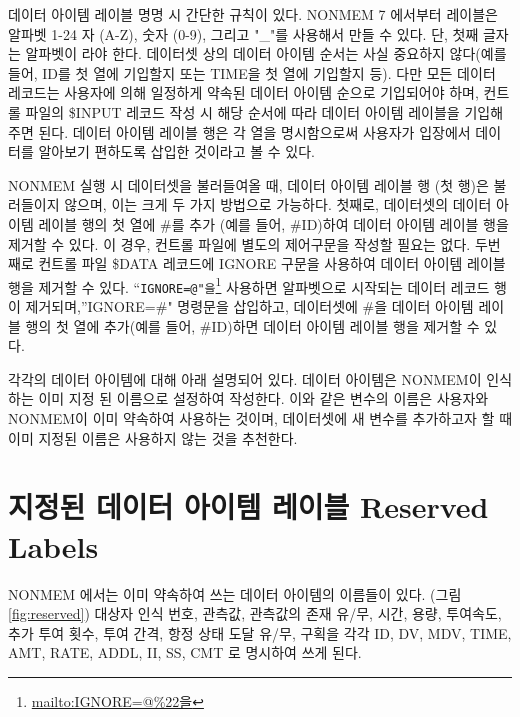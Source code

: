 \documentclass[
  10pt,
]{krantz}
\renewcommand{\href}[2]{#2\footnote{\url{#1}}}
\begin{document}
데이터 아이템 레이블 명명 시 간단한 규칙이 있다. NONMEM 7 에서부터 레이블은 알파벳 1-24 자 (A-Z), 숫자 (0-9), 그리고 "\_"를 사용해서 만들 수 있다. 단, 첫째 글자는 알파벳이 라야 한다. 데이터셋 상의 데이터 아이템 순서는 사실 중요하지 않다(예를 들어, ID를 첫 열에 기입할지 또는 TIME을 첫 열에 기입할지 등). 다만 모든 데이터 레코드는 사용자에 의해 일정하게 약속된 데이터 아이템 순으로 기입되어야 하며, 컨트롤 파일의 \$INPUT 레코드 작성 시 해당 순서에 따라 데이터 아이템 레이블을 기입해주면 된다. 데이터 아이템 레이블 행은 각 열을 명시함으로써 사용자가 입장에서 데이터를 알아보기 편하도록 삽입한 것이라고 볼 수 있다.

NONMEM 실행 시 데이터셋을 불러들여올 때, 데이터 아이템 레이블 행 (첫 행)은 불러들이지 않으며, 이는 크게 두 가지 방법으로 가능하다. 첫째로, 데이터셋의 데이터 아이템 레이블 행의 첫 열에 \#를 추가 (예를 들어, \#ID)하여 데이터 아이템 레이블 행을 제거할 수 있다. 이 경우, 컨트롤 파일에 별도의 제어구문을 작성할 필요는 없다. 두번째로 컨트롤 파일 \$DATA 레코드에 IGNORE 구문을 사용하여 데이터 아이템 레이블 행을 제거할 수 있다. ``\href{mailto:IGNORE=@\%22을}{\nolinkurl{IGNORE=@"을}} 사용하면 알파벳으로 시작되는 데이터 레코드 행이 제거되며,''IGNORE=\#" 명령문을 삽입하고, 데이터셋에 \#을 데이터 아이템 레이블 행의 첫 열에 추가(예를 들어, \#ID)하면 데이터 아이템 레이블 행을 제거할 수 있다.

각각의 데이터 아이템에 대해 아래 설명되어 있다. 데이터 아이템은 NONMEM이 인식하는 이미 지정 된 이름으로 설정하여 작성한다. 이와 같은 변수의 이름은 사용자와 NONMEM이 이미 약속하여 사용하는 것이며, 데이터셋에 새 변수를 추가하고자 할 때 이미 지정된 이름은 사용하지 않는 것을 추천한다.

\hypertarget{uxc9c0uxc815uxb41c-uxb370uxc774uxd130-uxc544uxc774uxd15c-uxb808uxc774uxbe14-reserved-labels}{%
\section{지정된 데이터 아이템 레이블 Reserved Labels}\label{uxc9c0uxc815uxb41c-uxb370uxc774uxd130-uxc544uxc774uxd15c-uxb808uxc774uxbe14-reserved-labels}}

NONMEM 에서는 이미 약속하여 쓰는 데이터 아이템의 이름들이 있다. (그림 \ref{fig:reserved}) 대상자 인식 번호, 관측값, 관측값의 존재 유/무, 시간, 용량, 투여속도, 추가 투여 횟수, 투여 간격, 항정 상태 도달 유/무, 구획을 각각 ID, DV, MDV, TIME, AMT, RATE, ADDL, II, SS, CMT 로 명시하여 쓰게 된다.
\end{document}
